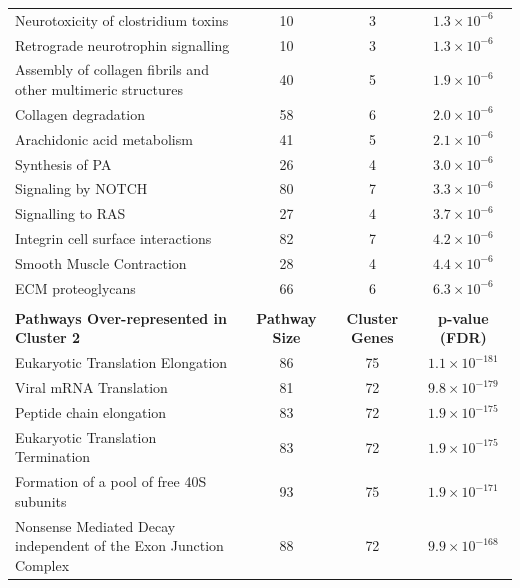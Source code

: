 \begin{table}[!hp]
{\begin{tabular}{lccc}
  \rowcolor{Cluster_Blue!15} 
  Neurotoxicity of clostridium toxins &  10 &   3 & $1.3 \times 10^{-6}$ \\
  \rowcolor{Cluster_Blue!20} 
  Retrograde neurotrophin signalling &  10 &   3 & $1.3 \times 10^{-6}$ \\
  \rowcolor{Cluster_Blue!15} 
  Assembly of collagen fibrils and other multimeric structures &  40 &   5 & $1.9 \times 10^{-6}$ \\
  \rowcolor{Cluster_Blue!20} 
  Collagen degradation &  58 &   6 & $2.0 \times 10^{-6}$ \\
  \rowcolor{Cluster_Blue!15} 
  Arachidonic acid metabolism &  41 &   5 & $2.1 \times 10^{-6}$ \\
  \rowcolor{Cluster_Blue!20} 
  Synthesis of PA &  26 &   4 & $3.0 \times 10^{-6}$ \\
  \rowcolor{Cluster_Blue!15} 
  Signaling by NOTCH &  80 &   7 & $3.3 \times 10^{-6}$ \\
  \rowcolor{Cluster_Blue!20} 
  Signalling to RAS &  27 &   4 & $3.7 \times 10^{-6}$ \\
  \rowcolor{Cluster_Blue!15} 
  Integrin cell surface interactions &  82 &   7 & $4.2 \times 10^{-6}$ \\
  \rowcolor{Cluster_Blue!20} 
  Smooth Muscle Contraction &  28 &   4 & $4.4 \times 10^{-6}$ \\
  \rowcolor{Cluster_Blue!15} 
  ECM proteoglycans &  66 &   6 & $6.3 \times 10^{-6}$ \\ 
  \hline
  \\
  \cellcolor{white} \large{\textbf{Pathways Over-represented in Cluster 2}} & \large{\textbf{Pathway Size}} & \large{\textbf{Cluster Genes}} & \large{\textbf{p-value (FDR)}} \\ %
  \hline
  \rowcolor{Cluster_Green!20}
  Eukaryotic Translation Elongation &  86 &  75 & $1.1 \times 10^{-181}$ \\
  \rowcolor{Cluster_Green!15} 
  Viral mRNA Translation &  81 &  72 & $9.8 \times 10^{-179}$ \\
  \rowcolor{Cluster_Green!20} 
  Peptide chain elongation &  83 &  72 & $1.9 \times 10^{-175}$ \\
  \rowcolor{Cluster_Green!15} 
  Eukaryotic Translation Termination &  83 &  72 & $1.9 \times 10^{-175}$ \\
  \rowcolor{Cluster_Green!20} 
  Formation of a pool of free 40S subunits &  93 &  75 & $1.9 \times 10^{-171}$ \\
  \rowcolor{Cluster_Green!15} 
  Nonsense Mediated Decay independent of the Exon Junction Complex &  88 &  72 & $9.9 \times 10^{-168}$ \\

\end{tabular}}
\end{table}
